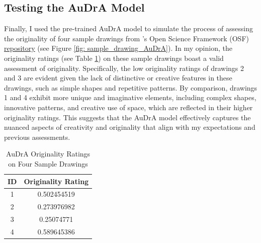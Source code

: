 \documentclass[../Proposal.tex]{subfiles}
\begin{document}
\subsection*{Testing the AuDrA Model}
Finally, I used the pre-trained AuDrA model to simulate the process of assessing the originality of four sample drawings from \textcite{patterson_audra_2023}'s Open Science Framework (OSF) \href{https://osf.io/kqn9v/}{repository} (see Figure \ref{fig: sample_drawing_AuDrA}). In my opinion, the originality ratings (see Table \ref{tab: audra_sample_rating}) on these sample drawings boast a valid assessment of originality. Specifically, the low originality ratings of drawings 2 and 3 are evident given the lack of distinctive or creative features in these drawings, such as simple shapes and repetitive patterns. By comparison, drawings 1 and 4 exhibit more unique and imaginative elements, including complex shapes, innovative patterns, and creative use of space, which are reflected in their higher originality ratings. This suggests that the AuDrA model effectively captures the nuanced aspects of creativity and originality that align with my expectations and previous assessments.

\begin{table}[htbp]
    \centering
    \begin{tabular}{c c} 
        \hline
        ID & Originality Rating \\ 
        \hline
        1 & 0.502454519 \\ 
        2 & 0.273976982 \\
        3 & 0.25074771 \\
        4 & 0.589645386 \\
        \hline
    \end{tabular}
    \caption{AuDrA Originality Ratings on Four Sample Drawings}
    \label{tab: audra_sample_rating}
\end{table}
\end{document}
